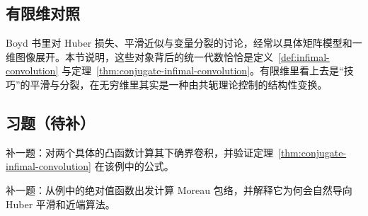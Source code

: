 \subsection*{有限维对照}

Boyd 书里对 Huber 损失、平滑近似与变量分裂的讨论，经常以具体矩阵模型和一维图像展开。本节说明，这些对象背后的统一代数恰恰是定义~\ref{def:infimal-convolution} 与定理~\ref{thm:conjugate-infimal-convolution}。有限维里看上去是“技巧”的平滑与分裂，在无穷维里其实是一种由共轭理论控制的结构性变换。

\subsection*{习题（待补）}

\begin{exercise}[下确界卷积占位]\label{exr:infimal-convolution-placeholder}
补一题：对两个具体的凸函数计算其下确界卷积，并验证定理~\ref{thm:conjugate-infimal-convolution} 在该例中的公式。
\end{exercise}

\begin{exercise}\label{exr:moreau-envelope-placeholder}
补一题：从例中的绝对值函数出发计算 Moreau 包络，并解释它为何会自然导向 Huber 平滑和近端算法。
\end{exercise}
